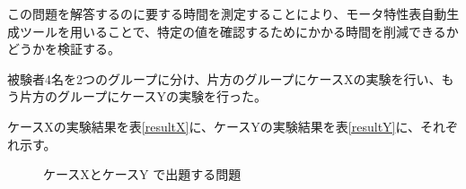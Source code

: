 この問題を解答するのに要する時間を測定することにより、モータ特性表自動生成ツールを用いることで、特定の値を確認するためにかかる時間を削減できるかどうかを検証する。

被験者4名を2つのグループに分け、片方のグループにケースXの実験を行い、もう片方のグループにケースYの実験を行った。

ケースXの実験結果を表\ref{resultX}に、ケースYの実験結果を表\ref{resultY}に、それぞれ示す。

\begin{figure}[htbp]
	\centering
	\caption{ケースXとケースY で出題する問題}
	\label{fig:mondai}
\end{figure}
